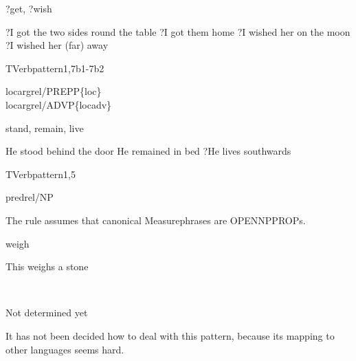\begin{thetadescr}
\evitem ?get, ?wish
\esitem
     \begin{examples}
        \example ?I got the two sides round the table
        \example ?I got them home
        \example ?I wished her on the moon
        \example ?I wished her (far) away
     \end{examples}
\end{thetadescr}


\newpage
\verbpattern{[synLOCOPENPREPPPROP] }
\begin{vpattern}
 TVerbpattern1,7b1-7b2
\csritem \mbox{}\\
     \begin{csr}
      locargrel/PREPP\{loc\}\\
      locargrel/ADVP\{locadv\}
     \end{csr}
\remarksitem
\end{vpattern}


\begin{thetadescr}
\evitem stand, remain, live
\esitem
     \begin{examples}
        \example He stood behind the door
        \example He remained in bed
        \example ?He lives southwards
     \end{examples}
\end{thetadescr}


\newpage
\verbpattern{[synMEASUREPHRASE]}
\begin{vpattern}
 TVerbpattern1,5
\csritem \mbox{}\\
     \begin{csr}
     predrel/NP
     \end{csr}
\remarksitem The rule assumes that canonical Measurephrases are OPENNPPROPs.

\end{vpattern}


\begin{thetadescr}
\evitem weigh
\esitem
     \begin{examples}
        \example This weighs a stone
     \end{examples}
\end{thetadescr}


\newpage
\verbpattern{[synNOTPROSENT]}
\begin{vpattern}
 \norule
\csritem \mbox{}\\
     \begin{csr}
       Not determined yet
     \end{csr}
\remarksitem It has not been decided how to deal with this pattern, because its 
mapping to other languages seems hard.
\end{vpattern}



